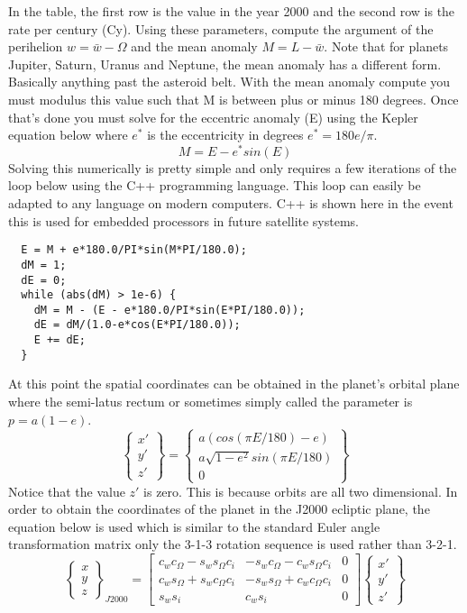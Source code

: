 \documentclass{article}
\begin{document}
In the table, the first row is the value in the year 2000 and
the second row is the rate per century (Cy). Using these parameters,
compute the argument of the perihelion $w = \bar{w} - \Omega$ and the
mean anomaly $M = L - \bar{w}$. Note that for planets Jupiter, Saturn,
Uranus and Neptune, the mean anomaly has a different form. Basically
anything past the asteroid belt. With the mean anomaly compute you
must modulus this value such that M is between plus or minus 180
degrees. Once that's done you must solve for the eccentric anomaly (E)
using the Kepler equation below where $e^*$ is the eccentricity in
degrees $e^* = 180e/\pi$. 
\begin{equation}
  M = E-e^*sin(E)
\end{equation}
Solving this numerically is pretty simple and only requires a few
iterations of the loop below using the C++ programming language. This
loop can easily be adapted to any language on modern computers. C++ is
shown here in the event this is used for embedded processors in future
satellite systems. 
\begin{verbatim}
  E = M + e*180.0/PI*sin(M*PI/180.0);
  dM = 1;
  dE = 0;
  while (abs(dM) > 1e-6) {
    dM = M - (E - e*180.0/PI*sin(E*PI/180.0));
    dE = dM/(1.0-e*cos(E*PI/180.0));
    E += dE;
  }        
\end{verbatim}
At this point the spatial coordinates can be obtained in the planet's
orbital plane where the semi-latus rectum or sometimes simply called
the parameter is $p=a(1-e)$. 
\begin{equation}
  \begin{Bmatrix} x' \\ y' \\ z' \end{Bmatrix} = \begin{Bmatrix} a(cos(\pi E/180) - e)
    \\ a\sqrt{1-e^2}sin(\pi E/180) \\ 0 \end{Bmatrix}
\end{equation}
Notice that the value $z'$ is zero. This is because orbits are all two
dimensional. In order to obtain the coordinates of the planet in the
J2000 ecliptic plane, the equation below is used which is similar to
the standard Euler angle transformation matrix only the 3-1-3 rotation
sequence is used rather than 3-2-1. 
\begin{equation}
  \begin{Bmatrix} x \\ y \\ z \end{Bmatrix}_{J2000} = \begin{bmatrix} c_wc_{\Omega}-s_ws_{\Omega}c_i &
    -s_wc_{\Omega}-c_ws_{\Omega}c_i & 0
    \\ c_ws_{\Omega}+s_wc_{\Omega}c_i &
    -s_ws_{\Omega}+c_wc_{\Omega}c_i & 0 \\
    s_ws_i & c_ws_i & 0 \end{bmatrix} \begin{Bmatrix} x' \\ y' \\ z' \end{Bmatrix}
\end{equation}
\end{document}
